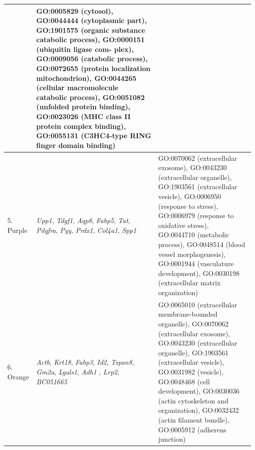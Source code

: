 \documentclass[10pt,letterpaper]{article}
\begin{document}
\begin{table}[!hp]
\begin{adjustwidth}{-2in}{0in}
\begin{tabular}{|p{1.0in}|p{1.5in}|p{4.3in}|}
& GO:0005829 (cytosol), GO:0044444 (cytoplasmic part), GO:1901575 (organic substance catabolic process), GO:0000151 (ubiquitin ligase com- plex),  GO:0009056 (catabolic process), GO:0072655 (protein localization mitochondrion), GO:0044265 (cellular macromolecule catabolic process), GO:0051082 (unfolded protein binding), GO:0023026 (MHC class II protein complex binding), GO:0055131 (C3HC4-type RING finger domain binding) \\
\hline
5. Purple & \textit{Upp1}, \textit{Tdgf1}, \textit{Aqp8}, \textit{Fabp5}, \textit{Tat}, \textit{Pdgfra}, \textit{Pyy}, \textit{Prdx1}, \textit{Col4a1}, \textit{Spp1}
& GO:0070062 (extracellular exosome), GO:0043230 (extracellular organelle), GO:1903561 (extracellular vesicle), GO:0006950 (response to stress), GO:0006979 (response to oxidative stress), GO:0044710 (metabolic process), GO:0048514 (blood vessel morphogenesis), GO:0001944 (vasculature development), GO:0030198 (extracellular matrix organization) \\
\hline
6. Orange & \textit{Actb}, \textit{Krt18}, \textit{Fabp3}, \textit{Id2}, \textit{Tspan8}, \textit{Gm2a}, \textit{Lgals1}, \textit{Adh1}
, \textit{Lrp2}, \textit{BC051665}
& GO:0065010 (extracellular membrane-bounded organelle), GO:0070062 (extracellular exosome),  GO:0043230 (extracellular organelle), GO:1903561 (extracellular vesicle), GO:0031982 (vesicle), GO:0048468 (cell development), GO:0030036 (actin cytoskeleton and organization), GO:0032432 (actin filament bundle),  GO:0005912 (adherens junction)\\
\hline
\end{tabular} \label{tab3}
\end{adjustwidth}
 \end{table}

 \clearpage
\end{document}
